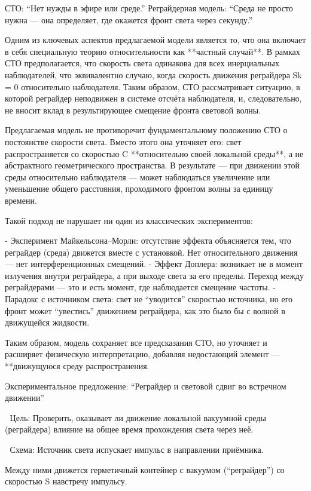 \documentclass[12pt]{article}
\begin{document}
СТО: “Нет нужды в эфире или среде.”
Реграйдерная модель: “Среда не просто нужна — она определяет, где окажется фронт света через секунду.”

Одним из ключевых аспектов предлагаемой модели является то, что она включает в себя специальную теорию относительности как **частный случай**. В рамках СТО предполагается, что скорость света одинакова для всех инерциальных наблюдателей, что эквивалентно случаю, когда скорость движения реграйдера Sk = 0 относительно наблюдателя. Таким образом, СТО рассматривает ситуацию, в которой реграйдер неподвижен в системе отсчёта наблюдателя, и, следовательно, не вносит вклад в результирующее смещение фронта световой волны.

Предлагаемая модель не противоречит фундаментальному положению СТО о постоянстве скорости света. Вместо этого она уточняет его: свет распространяется со скоростью C **относительно своей локальной среды**, а не абстрактного геометрического пространства. В результате — при движении этой среды относительно наблюдателя — может наблюдаться увеличение или уменьшение общего расстояния, проходимого фронтом волны за единицу времени.

Такой подход не нарушает ни один из классических экспериментов:

- Эксперимент Майкельсона–Морли: отсутствие эффекта объясняется тем, что реграйдер (среда) движется вместе с установкой. Нет относительного движения — нет интерференционных смещений.
- Эффект Доплера: возникает не в момент излучения внутри реграйдера, а при выходе света за его пределы. Переход между реграйдерами — это и есть момент, где наблюдается смещение частоты.
- Парадокс с источником света: свет не “уводится” скоростью источника, но его фронт может “увестись” движением реграйдера, как это было бы с волной в движущейся жидкости.

Таким образом, модель сохраняет все предсказания СТО, но уточняет и расширяет физическую интерпретацию, добавляя недостающий элемент — **движущуюся среду распространения.


Экспериментальное предложение: “Реграйдер и световой сдвиг во встречном движении”

📌 Цель:
Проверить, оказывает ли движение локальной вакуумной среды (реграйдера) влияние на общее время прохождения света через неё.

📐 Схема:
Источник света испускает импульс в направлении приёмника.

Между ними движется герметичный контейнер с вакуумом (“реграйдер”) со скоростью S навстречу импульсу.
\end{document}
